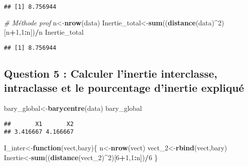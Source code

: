 \documentclass[]{article}
\newenvironment{Shaded}{\begin{snugshade}}{\end{snugshade}}
\newcommand{\CommentTok}[1]{\textcolor[rgb]{0.56,0.35,0.01}{\textit{#1}}}
\newcommand{\ControlFlowTok}[1]{\textcolor[rgb]{0.13,0.29,0.53}{\textbf{#1}}}
\newcommand{\DecValTok}[1]{\textcolor[rgb]{0.00,0.00,0.81}{#1}}
\newcommand{\KeywordTok}[1]{\textcolor[rgb]{0.13,0.29,0.53}{\textbf{#1}}}
\newcommand{\NormalTok}[1]{#1}
\newcommand{\OperatorTok}[1]{\textcolor[rgb]{0.81,0.36,0.00}{\textbf{#1}}}
\begin{document}
\begin{verbatim}
## [1] 8.756944
\end{verbatim}

\begin{Shaded}
\begin{Highlighting}[]
\CommentTok{# Méthode prof}
\NormalTok{n<-}\KeywordTok{nrow}\NormalTok{(data)}
\NormalTok{Inertie_total<-}\KeywordTok{sum}\NormalTok{((}\KeywordTok{distance}\NormalTok{(data)}\OperatorTok{^}\DecValTok{2}\NormalTok{)[n}\OperatorTok{+}\DecValTok{1}\NormalTok{,}\DecValTok{1}\OperatorTok{:}\NormalTok{n])}\OperatorTok{/}\NormalTok{n}
\NormalTok{Inertie_total}
\end{Highlighting}
\end{Shaded}

\begin{verbatim}
## [1] 8.756944
\end{verbatim}

\hypertarget{question-5-calculer-linertie-interclasse-intraclasse-et-le-pourcentage-dinertie-expliquuxe9}{%
\subsection{Question 5 : Calculer l'inertie interclasse, intraclasse et
le pourcentage d'inertie
expliqué}\label{question-5-calculer-linertie-interclasse-intraclasse-et-le-pourcentage-dinertie-expliquuxe9}}

\begin{Shaded}
\begin{Highlighting}[]
\NormalTok{bary_global<-}\KeywordTok{barycentre}\NormalTok{(data)}
\NormalTok{bary_global}
\end{Highlighting}
\end{Shaded}

\begin{verbatim}
##       X1       X2 
## 3.416667 4.166667
\end{verbatim}

\begin{Shaded}
\begin{Highlighting}[]
\NormalTok{I_inter<-}\ControlFlowTok{function}\NormalTok{(vect,bary)\{}
\NormalTok{  n<-}\KeywordTok{nrow}\NormalTok{(vect)}
\NormalTok{  vect_}\DecValTok{2}\NormalTok{<-}\KeywordTok{rbind}\NormalTok{(vect,bary)}
\NormalTok{  Inertie<-}\KeywordTok{sum}\NormalTok{((}\KeywordTok{distance}\NormalTok{(vect_}\DecValTok{2}\NormalTok{)}\OperatorTok{^}\DecValTok{2}\NormalTok{)[}\DecValTok{6}\OperatorTok{+}\DecValTok{1}\NormalTok{,}\DecValTok{1}\OperatorTok{:}\NormalTok{n])}\OperatorTok{/}\DecValTok{6}
\NormalTok{\}}
\end{Highlighting}
\end{Shaded}
\end{document}
